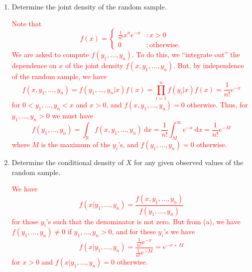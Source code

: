 \documentclass[12pt,reqno]{amsart}
\begin{document}
\medskip
\begin{enumerate}
\item Determine the joint density of the random sample.

\bigskip
\textcolor{red}{Note that
	\[f(x) = \begin{cases}
	\frac{1}{n!} x^n e^{-x} & : x>0\\
	0 & : \text{otherwise}.
	\end{cases}
	\]
We are asked to compute $f(y_1,\ldots,y_n)$. To do this, we ``integrate out'' the dependence on $x$ of the joint density $f(x,y_1,\ldots,y_n)$. But, by independence of the random sample, we have
	\[f(x,y_1,\ldots,y_n) = f(y_1,\ldots,y_n|x)f(x) = \prod_{i=1}^n f(y_i|x)f(x) = \frac{1}{n! } e^{-x}
	\]
for $0<y_1,\ldots,y_n<x$ and $x>0$, and $f(x,y_1,\ldots,y_n)=0$ otherwise. Thus, for $y_1,\ldots,y_n>0$ we must have
	\[f(y_1,\ldots,y_n) = \int_{\mathbb{R}} f(x,y_1,\ldots,y_n)  \ \text{d}x = \frac{1}{n!} \int_{M}^\infty e^{-x} \ \text{d}x = \frac{1}{n!}e^{-M}
	\]
where $M$ is the maximum of the $y_i$'s, and $f(y_1,\ldots,y_n)=0$ otherwise.}
\bigskip

\item Determine the conditional density of $X$ for any given observed values of the random sample.

\bigskip
\textcolor{red}{We have
	\[f(x|y_1,\ldots,y_n) = \frac{f(x,y_1,\ldots,y_n)}{f(y_1,\ldots,y_n)}
	\]
for those $y_i$'s such that the denominator is not zero. But from (a), we have $f(y_1,\ldots,y_n)\neq 0$ if $y_1,\ldots,y_n>0$, and for these $y_i$'s we have
	\[f(x|y_1,\ldots,y_n) = \frac{\frac{1}{n!}e^{-x}}{\frac{1}{n!}e^{-M}} = e^{-x+M}
	\]
for $x>0$ and $f(x|y_1,\ldots,y_n)=0$ otherwise.}
\bigskip

\end{enumerate}
\end{document}
